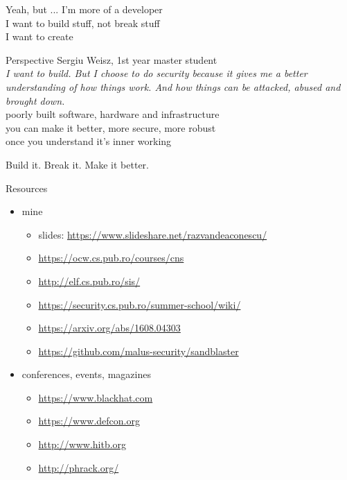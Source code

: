 \documentclass{simple}
\begin{document}
\begin{frame}{Yeah, but ...}
  \centering
  \pause I'm more of a developer \\
  \vspace{0.5cm}
  \pause I want to build stuff, not break stuff \\
  \vspace{0.5cm}
  \pause I want to create
\end{frame}

\begin{frame}{Perspective}
  \pause Sergiu Weisz, 1st year master student \\
  \vspace{0.5cm}
  \pause \textit{I want to build. But I choose to do security because it gives me a better understanding of how things work. And how things can be attacked, abused and brought down.} \\
  \vspace{0.5cm}
  \pause poorly built software, hardware and infrastructure \\
  \vspace{0.5cm}
  \pause you can make it better, more secure, more robust \\
  \vspace{0.5cm}
  \pause once you understand it's inner working
\end{frame}

\begin{frame}{}
  \centering
  \LARGE{Build it. \pause Break it. \pause Make it better.}
\end{frame}

\begin{frame}{Resources}
  \begin{itemize}
    \item mine
      \begin{itemize}
        \item slides: \url{https://www.slideshare.net/razvandeaconescu/}
        \item \url{https://ocw.cs.pub.ro/courses/cns}
        \item \url{http://elf.cs.pub.ro/sis/}
        \item \url{https://security.cs.pub.ro/summer-school/wiki/}
        \item \url{https://arxiv.org/abs/1608.04303}
        \item \url{https://github.com/malus-security/sandblaster}
      \end{itemize}
    \item conferences, events, magazines
      \begin{itemize}
        \item \url{https://www.blackhat.com}
        \item \url{https://www.defcon.org}
        \item \url{http://www.hitb.org}
        \item \url{http://phrack.org/}
      \end{itemize}
  \end{itemize}
\end{frame}
\end{document}
